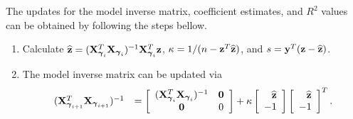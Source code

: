 The updates for the model inverse matrix, coefficient estimates, and $R^2$ values can be obtained by following the steps bellow.
\begin{enumerate}
	\item Calculate $\widehat{{\bf z}} = ({\bf X}_{{\boldsymbol \gamma}_i}^T{\bf X}_{{\boldsymbol \gamma}_i})^{-1}{\bf X}_{{\boldsymbol \gamma}_i}^T{\bf z}$, 
	$\kappa 
	= 1/(n - {\bf z}^T\widehat{{\bf z}})$, and  $s = {\bf y}^T({\bf z} - \widehat{{\bf z}})$.
	
	\item The model inverse matrix can be updated via  
	$$
	\begin{array}{rl}
	({\bf X}_{{\boldsymbol \gamma}_{i+1}}^T{\bf X}_{{\boldsymbol \gamma}_{i+1}})^{-1}
	&\displaystyle = 
	\left[ \begin{array}{cc}
	({\bf X}_{{\boldsymbol \gamma}_{i}}^T{\bf X}_{{\boldsymbol \gamma}_{i}})^{-1}    & {\bf 0} \\
	{\bf 0}             
	& 0
	\end{array} \right] + \kappa \left[ \begin{array}{r}
	\widehat{{\bf z}} \\
	-1 \\
	\end{array} \right] \left[ \begin{array}{r}
	\widehat{{\bf z}} \\
	-1 \\
	\end{array} \right]^T.
	\end{array} 
	$$
	

\end{enumerate}
